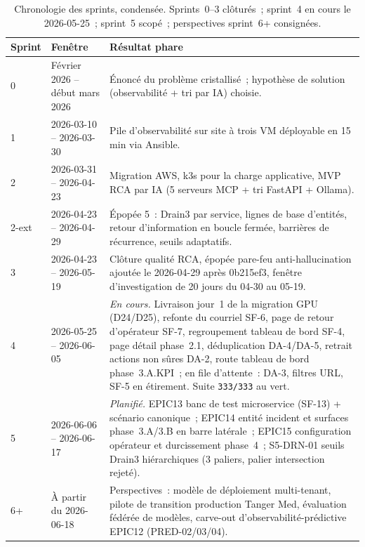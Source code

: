 \documentclass[11pt,a4paper,oneside]{report}
\begin{document}
\begin{table}[h]
\centering
\small
\begin{tabular}{p{} p{} p{}}
\toprule
\textbf{Sprint} & \textbf{Fenêtre} & \textbf{Résultat phare} \\
\midrule
0 & Février 2026 -- début mars 2026 & Énoncé du problème
cristallisé~; hypothèse de solution (observabilité + tri par IA)
choisie. \\
1 & 2026-03-10 -- 2026-03-30 & Pile d'observabilité sur site à
trois VM déployable en 15\,min via Ansible. \\
2 & 2026-03-31 -- 2026-04-23 & Migration AWS, k3s pour la charge
applicative, MVP RCA par IA (5 serveurs MCP + tri FastAPI +
Ollama). \\
2-ext & 2026-04-23 -- 2026-04-29 & Épopée 5~: Drain3 par service,
lignes de base d'entités, retour d'information en boucle fermée,
barrières de récurrence, seuils adaptatifs. \\
3 & 2026-04-23 -- 2026-05-19 & Clôture qualité RCA, épopée
pare-feu anti-hallucination ajoutée le 2026-04-29 après
0b215ef3, fenêtre d'investigation de 20 jours du 04-30 au
05-19. \\
4 & 2026-05-25 -- 2026-06-05 & \emph{En cours.} Livraison jour~1
de la migration GPU (D24/D25), refonte du courriel SF-6, page de
retour d'opérateur SF-7, regroupement tableau de bord SF-4, page
détail phase~2.1, déduplication DA-4/DA-5, retrait actions
non sûres DA-2, route tableau de bord phase~3.A.KPI~; en file
d'attente~: DA-3, filtres URL, SF-5 en étirement. Suite
\texttt{333/333} au vert. \\
5 & 2026-06-06 -- 2026-06-17 & \emph{Planifié.} EPIC13 banc de
test microservice (SF-13) + scénario canonique~; EPIC14 entité
incident et surfaces phase~3.A/3.B en barre latérale~; EPIC15
configuration opérateur et durcissement phase~4~; S5-DRN-01
seuils Drain3 hiérarchiques (3 paliers, palier intersection
rejeté). \\
6+ & À partir du 2026-06-18 & Perspectives~: modèle de
déploiement multi-tenant, pilote de transition production Tanger
Med, évaluation fédérée de modèles, carve-out
d'observabilité-prédictive EPIC12 (PRED-02/03/04). \\
\bottomrule
\end{tabular}
\caption{Chronologie des sprints, condensée. Sprints~0--3
clôturés~; sprint~4 en cours le 2026-05-25~; sprint~5 scopé~;
perspectives sprint~6+ consignées.}
\label{tab:sprint-summary}
\end{table}
\end{document}
